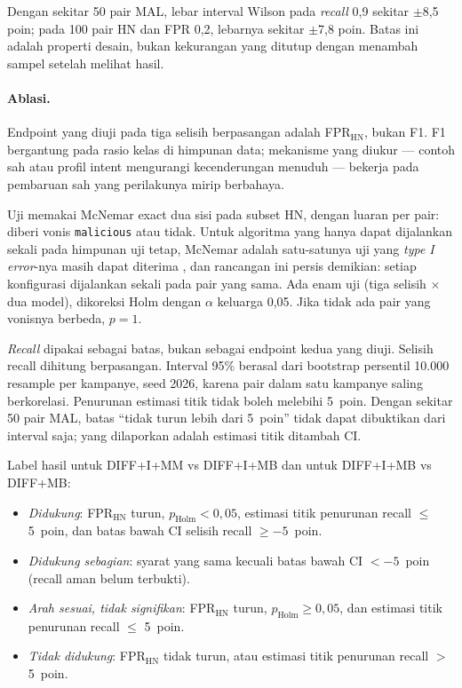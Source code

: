 \documentclass[a4paper,fleqn]{cas-dc}
\begin{document}
Dengan sekitar 50 pair MAL, lebar interval Wilson pada \emph{recall} 0,9
sekitar $\pm$8,5 poin; pada 100 pair HN dan FPR 0,2, lebarnya sekitar
$\pm$7,8 poin. Batas ini adalah properti desain, bukan kekurangan yang ditutup
dengan menambah sampel setelah melihat hasil.

\paragraph{Ablasi.}
Endpoint yang diuji pada tiga selisih berpasangan adalah FPR$_{\mathrm{HN}}$,
bukan F1. F1 bergantung pada rasio kelas di himpunan data; mekanisme yang
diukur --- contoh sah atau profil intent mengurangi kecenderungan menuduh ---
bekerja pada pembaruan sah yang perilakunya mirip berbahaya.

Uji memakai McNemar exact dua sisi pada subset HN, dengan luaran per pair:
diberi vonis \texttt{malicious} atau tidak. Untuk algoritma yang hanya dapat
dijalankan sekali pada himpunan uji tetap, McNemar adalah satu-satunya uji yang
\emph{type I error}-nya masih dapat diterima \citep{dietterich1998approximate},
dan rancangan ini persis demikian: setiap konfigurasi dijalankan sekali pada
pair yang sama. Ada enam uji (tiga selisih
$\times$ dua model), dikoreksi Holm dengan $\alpha$ keluarga 0,05. Jika tidak
ada pair yang vonisnya berbeda, $p{=}1$.

\emph{Recall} dipakai sebagai batas, bukan sebagai endpoint kedua yang diuji.
Selisih recall dihitung berpasangan. Interval 95\% berasal dari bootstrap
persentil 10.000 resample per kampanye, seed 2026, karena pair dalam satu
kampanye saling berkorelasi. Penurunan estimasi titik tidak boleh melebihi
5~poin. Dengan sekitar 50 pair MAL, batas ``tidak turun lebih dari 5~poin''
tidak dapat dibuktikan dari interval saja; yang dilaporkan adalah estimasi
titik ditambah CI.

Label hasil untuk DIFF+I+MM vs DIFF+I+MB dan untuk DIFF+I+MB vs DIFF+MB:

\begin{itemize}
\item \emph{Didukung}: FPR$_{\mathrm{HN}}$ turun, $p_{\mathrm{Holm}}{<}0{,}05$,
estimasi titik penurunan recall $\le$ 5~poin, dan batas bawah CI selisih
recall $\ge{-}5$~poin.
\item \emph{Didukung sebagian}: syarat yang sama kecuali batas bawah CI
$<{-}5$~poin (recall aman belum terbukti).
\item \emph{Arah sesuai, tidak signifikan}: FPR$_{\mathrm{HN}}$ turun,
$p_{\mathrm{Holm}}{\ge}0{,}05$, dan estimasi titik penurunan recall $\le$ 5~poin.
\item \emph{Tidak didukung}: FPR$_{\mathrm{HN}}$ tidak turun, atau estimasi
titik penurunan recall $>$ 5~poin.
\end{itemize}
\end{document}
